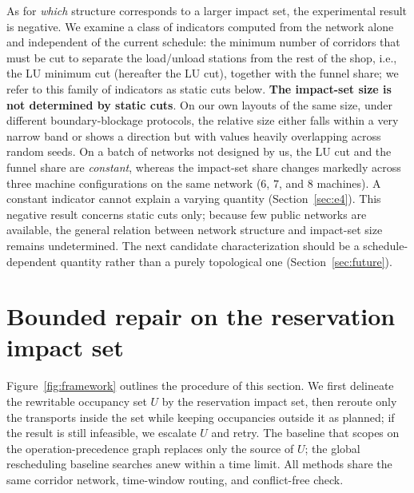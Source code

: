 As for \emph{which} structure corresponds to a larger impact set, the experimental result is negative.
We examine a class of indicators computed from the network alone and independent of the current schedule: the minimum number of corridors that must be cut to separate the load/unload stations from the rest of the shop,
i.e., the LU minimum cut (hereafter the LU cut), together with the funnel share; we refer to this family of indicators as static cuts below.
\textbf{The impact-set size is not determined by static cuts}. On our own layouts of the same size, under different boundary-blockage protocols, the
relative size either falls within a very narrow band or shows a direction but with values heavily overlapping across random seeds. On a batch of networks not designed by us,
the LU cut and the funnel share are \emph{constant}, whereas the impact-set share changes markedly across three machine configurations on the same network
(\(6\), \(7\), and \(8\) machines). A constant indicator cannot explain a varying quantity
(Section~\ref{sec:e4}).
This negative result concerns static cuts only; because few public networks are available, the general relation between network structure and impact-set size remains undetermined.
The next candidate characterization should be a schedule-dependent quantity rather than a purely topological one (Section~\ref{sec:future}).

\section{Bounded repair on the reservation impact set}
\label{sec:repair}

Figure~\ref{fig:framework} outlines the procedure of this section. We first delineate the rewritable occupancy set \(U\) by the reservation impact set,
then reroute only the transports inside the set while keeping occupancies outside it as planned; if the result is still infeasible, we escalate \(U\) and retry.
The baseline that scopes on the operation-precedence graph replaces only the source of \(U\); the global rescheduling baseline searches anew within a time limit.
All methods share the same corridor network, time-window routing, and conflict-free check.


